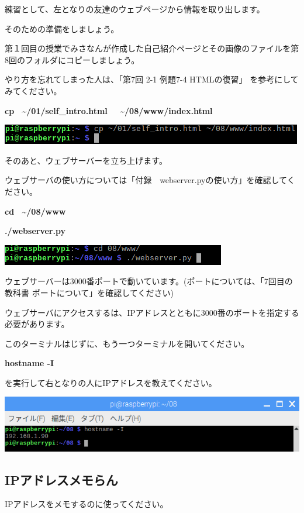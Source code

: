 練習として、左となりの友達のウェブページから情報を取り出します。

そのための準備をしましょう。

第１回目の授業でみさなんが作成した自己紹介ページとその画像のファイルを第8回のフォルダにコピーしましょう。

やり方を忘れてしまった人は、「第7回 2-1 例題7-4 HTMLの復習」 を参考にしてみてください。

\textbf{cp \ {\textasciitilde}/01/self\_intro.html \ \ {\textasciitilde}/08/www/index.html}



\begin{center}
\includegraphics[width=\textwidth]{./text08-img/textbook-img002.png}

\end{center}
\clearpage
そのあと、ウェブサーバーを立ち上げます。

ウェブサーバの使い方については「付録　webserver.pyの使い方」を確認してください。

\textbf{cd \ {\textasciitilde}/08/www}

\textbf{./webserver.py}



\begin{center}
\includegraphics[width=\textwidth]{./text08-img/textbook-img003.png}

\end{center}
ウェブサーバーは3000番ポートで動いています。(ポートについては、「7回目の教科書
ポートについて」を確認してください)%


ウェブサーバにアクセスするは、IPアドレスとともに3000番のポートを指定する必要があります。

このターミナルはじずに、もう一つターミナルを開いてください。

\textbf{hostname -I}

を実行して右となりの人にIPアドレスを教えてください。

\begin{center}
\includegraphics[width=\textwidth]{./text08-img/textbook-img004.png}

\end{center}
\clearpage\subsection*{IPアドレスメモらん}
IPアドレスをメモするのに使ってください。

